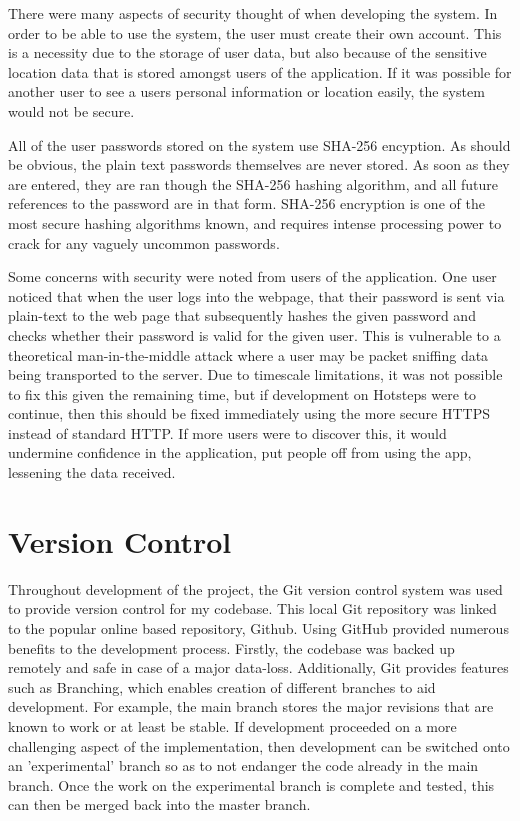 \documentclass{l4proj}
\begin{document}
There were many aspects of security thought of when developing the system. In order to be able to use the system, the user must create their own account. This is a necessity due to the storage of user data, but also because of the sensitive location data that is stored amongst users of the application. If it was possible for another user to see a users personal information or location easily, the system would not be secure.

All of the user passwords stored on the system use SHA-256 encyption. As should be obvious, the plain text passwords themselves are never stored. As soon as they are entered, they are ran though the SHA-256 hashing algorithm, and all future references to the password are in that form. SHA-256 encryption is one of the most secure hashing algorithms known, and requires intense processing power to crack for any vaguely uncommon passwords.

Some concerns with security were noted from users of the application. One user noticed that when the user logs into the webpage, that their password is sent via plain-text to the web page that subsequently hashes the given password and checks whether their password is valid for the given user. This is vulnerable to a theoretical man-in-the-middle attack where a user may be packet sniffing data being transported to the server. Due to timescale limitations, it was not possible to fix this given the remaining time, but if development on Hotsteps were to continue, then this should be fixed immediately using the more secure HTTPS instead of standard HTTP. If more users were to discover this, it would undermine confidence in the application, put people off from using the app, lessening the data received.

\section{Version Control}

Throughout development of the project, the Git version control system was used to provide version control for my codebase. This local Git repository was linked to the popular online based repository, Github.  Using GitHub provided numerous benefits to the development process. Firstly, the codebase was backed up remotely and safe in case of a major data-loss. Additionally, Git provides features such as Branching, which enables creation of different branches to aid development. For example, the main branch stores the major revisions that are known to work or at least be stable. If development proceeded on a more challenging aspect of the implementation, then development can be switched onto an 'experimental' branch so as to not endanger the code already in the main branch. Once the work on the experimental branch is complete and tested, this can then be merged back into the master branch.
\end{document}
